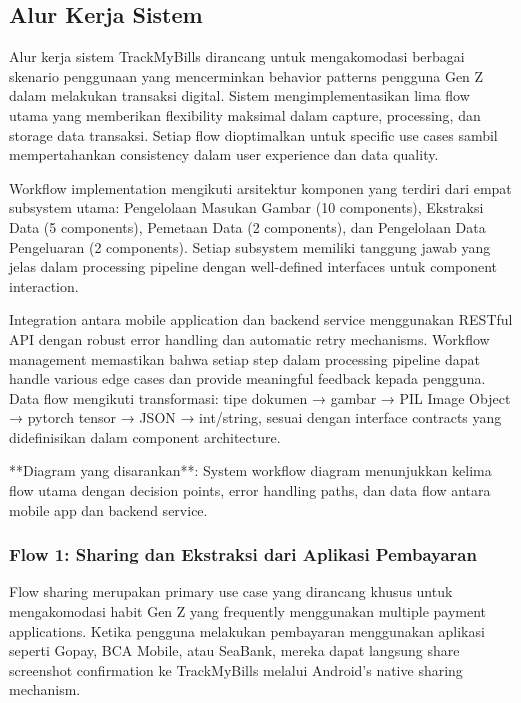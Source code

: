\subsection{Alur Kerja Sistem}
\label{subsec:alur-kerja-sistem}

Alur kerja sistem TrackMyBills dirancang untuk mengakomodasi berbagai skenario penggunaan yang mencerminkan behavior patterns pengguna Gen Z dalam melakukan transaksi digital. Sistem mengimplementasikan lima flow utama yang memberikan flexibility maksimal dalam capture, processing, dan storage data transaksi. Setiap flow dioptimalkan untuk specific use cases sambil mempertahankan consistency dalam user experience dan data quality.

Workflow implementation mengikuti arsitektur komponen yang terdiri dari empat subsystem utama: Pengelolaan Masukan Gambar (10 components), Ekstraksi Data (5 components), Pemetaan Data (2 components), dan Pengelolaan Data Pengeluaran (2 components). Setiap subsystem memiliki tanggung jawab yang jelas dalam processing pipeline dengan well-defined interfaces untuk component interaction.

Integration antara mobile application dan backend service menggunakan RESTful API dengan robust error handling dan automatic retry mechanisms. Workflow management memastikan bahwa setiap step dalam processing pipeline dapat handle various edge cases dan provide meaningful feedback kepada pengguna. Data flow mengikuti transformasi: tipe dokumen → gambar → PIL Image Object → pytorch tensor → JSON → int/string, sesuai dengan interface contracts yang didefinisikan dalam component architecture.

**Diagram yang disarankan**: System workflow diagram menunjukkan kelima flow utama dengan decision points, error handling paths, dan data flow antara mobile app dan backend service.

\subsubsection{Flow 1: Sharing dan Ekstraksi dari Aplikasi Pembayaran}
\label{subsubsec:flow-sharing}

Flow sharing merupakan primary use case yang dirancang khusus untuk mengakomodasi habit Gen Z yang frequently menggunakan multiple payment applications. Ketika pengguna melakukan pembayaran menggunakan aplikasi seperti Gopay, BCA Mobile, atau SeaBank, mereka dapat langsung share screenshot confirmation ke TrackMyBills melalui Android's native sharing mechanism.

